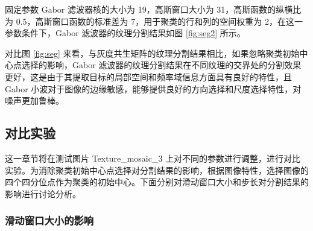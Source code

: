 固定参数 Gabor 滤波器核的大小为 19，高斯窗口大小为 31，高斯函数的纵横比为 0.5，高斯窗口函数的标准差为 7，用于聚类的行和列的空间权重为 2，在这一参数条件下，Gabor 滤波器的纹理分割结果如图 \ref{fig:seg2} 所示。


\begin{figure*}[!ht]
 \centering
  \begin{minipage}[b]{\linewidth} 	
  \end{minipage}
  \vfill
  \caption{Gabor 滤波器的纹理分割结果：(a) Texture\_mosaic\_1, (b) Texture\_mosaic\_2, (c)Texture\_mosaic\_3, (d) Texture\_mosaic\_4.}
  \label{fig:seg2}	
\end{figure*}

  对比图 \ref{fig:seg} 来看，与灰度共生矩阵的纹理分割结果相比，如果忽略聚类初始中心点选择的影响，Gabor 滤波器的纹理分割结果在不同纹理的交界处的分割效果更好，这是由于其提取目标的局部空间和频率域信息方面具有良好的特性，且 Gabor 小波对于图像的边缘敏感，能够提供良好的方向选择和尺度选择特性，对噪声更加鲁棒。

\subsection{对比实验}

这一章节将在测试图片 Texture\_mosaic\_3 上对不同的参数进行调整，进行对比实验。为消除聚类初始中心点选择对分割结果的影响，根据图像特性，选择图像的四个四分位点作为聚类的初始中心。下面分别对滑动窗口大小和步长对分割结果的影响进行讨论分析。

\subsubsection{滑动窗口大小的影响}

